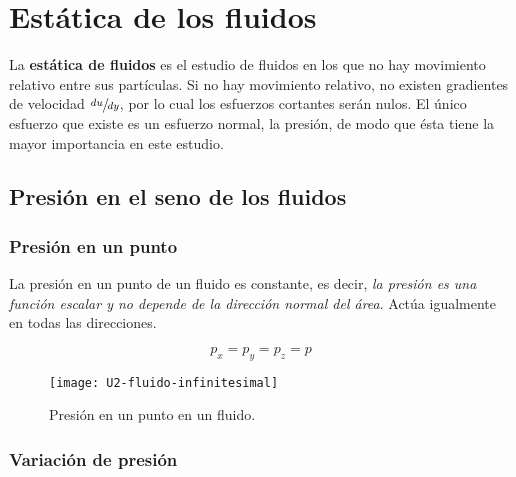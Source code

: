\section{Estática de los fluidos}

La \textbf{estática de fluidos} es el estudio de fluidos en los que no hay movimiento relativo entre sus partículas. Si no hay movimiento relativo, no existen gradientes de velocidad $\sfrac{du}{dy}$, por lo cual los esfuerzos cortantes serán nulos. El único esfuerzo que existe es un esfuerzo normal, la presión, de modo que ésta tiene la mayor importancia en este estudio.


\subsection{Presión en el seno de los fluidos}%

\subsubsection{Presión en un punto}

La presión en un punto de un fluido es constante, es decir, \textsl{la presión es una función escalar y no depende de la dirección normal del área}. Actúa igualmente en todas las direcciones.

\begin{equation}
	p_x = p_y = p_z = p
\end{equation}

\begin{figure}[H]
	\centering
	\texttt{[image: U2-fluido-infinitesimal]}
	\caption{Presión en un punto en un fluido.}
	\label{fig:elemento-infinitesimal}
\end{figure}

\subsubsection{Variación de presión}

